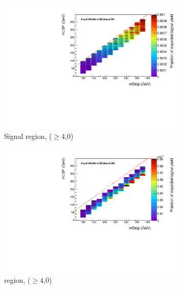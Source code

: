 \begin{figure}[p]
\begin{subfigure}[b]{0.47\textwidth}
    \includegraphics[width=\textwidth]{Figs/sms/t2degen/v23/effs/T2_4body_had_eff_maps_eq0b_ge4j_SITV.pdf}
    \caption{Signal region, ($\geq 4$,0)}
    \label{fig:t2_4body_sig_eff_ge4j_0b}
  \end{subfigure}
  \begin{subfigure}[b]{0.47\textwidth}
    \includegraphics[width=\textwidth]{Figs/sms/t2degen/v23/effs/T2_4body_muon_eff_maps_eq0b_ge4j_SITV.pdf}
    \caption{\mj region, ($\geq 4$,0)}
    \label{fig:t2_4body_mu_eff_ge4j_0b}
  \end{subfigure} \\
  \begin{subfigure}[b]{0.47\textwidth}

\end{subfigure}
\end{figure}
